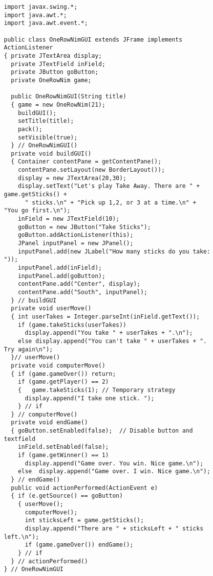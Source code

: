 \begin{figure}[p]
\jjjprogstart
\begin{jjjlisting}
\begin{lstlisting}[basicstyle=\scriptsize]
import javax.swing.*;
import java.awt.*;
import java.awt.event.*;

public class OneRowNimGUI extends JFrame implements ActionListener
{ private JTextArea display;
  private JTextField inField;
  private JButton goButton;
  private OneRowNim game;
	    
  public OneRowNimGUI(String title) 
  { game = new OneRowNim(21);  
    buildGUI();
    setTitle(title);
    pack();
    setVisible(true);
  } // OneRowNimGUI()
  private void buildGUI() 
  { Container contentPane = getContentPane();
    contentPane.setLayout(new BorderLayout());
    display = new JTextArea(20,30);
    display.setText("Let's play Take Away. There are " + game.getSticks() + 
      " sticks.\n" + "Pick up 1,2, or 3 at a time.\n" + "You go first.\n");
    inField = new JTextField(10);
    goButton = new JButton("Take Sticks");
    goButton.addActionListener(this);
    JPanel inputPanel = new JPanel();
    inputPanel.add(new JLabel("How many sticks do you take: "));
    inputPanel.add(inField);
    inputPanel.add(goButton);
    contentPane.add("Center", display);
    contentPane.add("South", inputPanel);
  } // buildGUI
  private void userMove()
  { int userTakes = Integer.parseInt(inField.getText());
    if (game.takeSticks(userTakes)) 
      display.append("You take " + userTakes + ".\n");
    else display.append("You can't take " + userTakes + ". Try again\n");
  }// userMove()
  private void computerMove() 
  { if (game.gameOver()) return;
    if (game.getPlayer() == 2) 
    {   game.takeSticks(1); // Temporary strategy
      display.append("I take one stick. ");
    } // if
  } // computerMove()
  private void endGame()
  { goButton.setEnabled(false);  // Disable button and textfield
    inField.setEnabled(false);
    if (game.getWinner() == 1)
      display.append("Game over. You win. Nice game.\n");
    else  display.append("Game over. I win. Nice game.\n");
  } // endGame()
  public void actionPerformed(ActionEvent e) 
  { if (e.getSource() == goButton) 
    { userMove();
      computerMove();
      int sticksLeft = game.getSticks();
      display.append("There are " + sticksLeft + " sticks left.\n");
      if (game.gameOver()) endGame();
    } // if
  } // actionPerformed()
} // OneRowNimGUI
\end{lstlisting}
\end{jjjlisting}
\end{figure}

